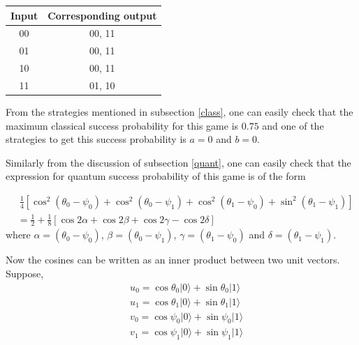 \documentclass[]{svjour3}
\begin{document}
\begin{table}[htbp]
	\begin{center}
		\begin{tabular}{ |c|c| } 
			\hline
			Input & Corresponding output\\
			\hline
			\hline
			00 & 00, 11\\
			\hline
			01 & 00, 11\\
			\hline
			10 & 00, 11\\
			\hline 
			11 & 01, 10\\
			\hline
		\end{tabular}
	\end{center}
	\label{2222}
\end{table}


From the strategies mentioned in subsection \ref{class}, one can easily check that the maximum classical success probability for this game is $0.75$ and one of the strategies to get this success probability is $a=0$ and $b=0$.

Similarly from the discussion of subsection \ref{quant}, one can easily check that the expression for quantum success probability of this game is of the form

\begin{align*}
&~ \frac{1}{4} \left[\cos^2(\theta_0 - \psi_0) + \cos^2(\theta_0 - \psi_1) + \cos^2(\theta_1 - \psi_0) + \sin^2(\theta_1 - \psi_1)\right]\\
&= \frac{1}{2} + \frac{1}{8} \left[\cos{2\alpha} + \cos{2\beta} + \cos{2\gamma} - \cos{2\delta}\right]
\end{align*}
where $\alpha=(\theta_0 - \psi_0)$, $\beta=(\theta_0 - \psi_1)$, $\gamma=(\theta_1 - \psi_0)$ and 
$\delta=(\theta_1 - \psi_1)$. 

Now the cosines can be written as an inner product between two unit vectors. 
Suppose,
\begin{align*}
&~ u_{0} = \cos{\theta_0} \vert 0 \rangle + \sin {\theta_0} \vert 1 \rangle\\
&~ u_{1} = \cos {\theta_1} \vert 0 \rangle + \sin {\theta_1} \vert 1 \rangle\\
&~ v_{0} = \cos{\psi_0} \vert 0 \rangle + \sin {\psi_0} \vert 1 \rangle\\
&~ v_{1} = \cos{\psi_1} \vert 0 \rangle+ \sin {\psi_1} \vert 1 \rangle
\end{align*}
\end{document}
